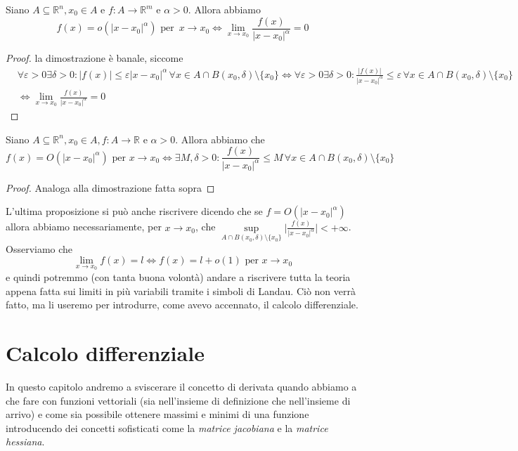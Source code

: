\documentclass[openany]{book}
\begin{document}
\begin{prop}
Siano $A \subseteq \mathbb{R}^n, x_0 \in  A$ e $f: A \to \mathbb{R}^m$ e $\alpha > 0$. Allora abbiamo
$$
f(x) = o(|x-x_0|^\alpha) \text{ per } \, x \to x_0 \iff \lim_{x \to x_0} \frac{f(x)}{|x-x_0|^\alpha} = 0
$$
\end{prop}
\begin{proof}
la dimostrazione è banale, siccome 
\begin{align*}
&\forall \varepsilon > 0 \exists \delta > 0: |f(x)| \leq \varepsilon |x-x_0|^\alpha \, \forall x \in A \cap B(x_0, \delta) \setminus \{ x_0 \} \iff \forall \varepsilon > 0 \exists \delta > 0: \frac{|f(x)|}{|x-x_0|^\alpha} \leq \varepsilon \, \forall x \in A \cap B(x_0, \delta) \setminus \{ x_0 \} \\ &\iff \lim_{x \to x_0} \frac{f(x)}{|x-x_0|^\alpha} = 0
\end{align*}
\end{proof}
\begin{prop}
Siano $A \subseteq \mathbb{R}^n, x_0 \in A, f: A \to \mathbb{R}$ e $\alpha > 0$. Allora abbiamo che $$f(x) = O(|x-x_0|^\alpha) \text{ per } x \to x_0 \iff \exists M, \delta > 0: \frac{f(x)}{|x-x_0|^\alpha} \leq M \, \forall x \in A \cap B(x_0, \delta) \setminus \{ x_0 \}$$
\end{prop}
\begin{proof}
Analoga alla dimostrazione fatta sopra
\end{proof}
\noindent L'ultima proposizione si può anche riscrivere dicendo che se $f=O(|x-x_0|^\alpha)$ allora abbiamo necessariamente, per $x \to x_0$, che $\sup\limits_{A \cap B(x_0, \delta) \setminus \{ x_0 \}} \Bigg| \frac{f(x)}{|x-x_0|^{\alpha}} \Bigg| < +\infty$. \\
Osserviamo che
$$
\lim_{x \to x_0} f(x) = l \iff f(x) = l + o(1) \text{ per } x \to x_0
$$
e quindi potremmo (con tanta buona volontà) andare a riscrivere tutta la teoria appena fatta sui limiti in più variabili tramite i simboli di Landau. Ciò non verrà fatto, ma li useremo per introdurre, come avevo accennato, il calcolo differenziale.
\chapter{Calcolo differenziale}
In questo capitolo andremo a sviscerare il concetto di derivata quando abbiamo a che fare con funzioni vettoriali (sia nell'insieme di definizione che nell'insieme di arrivo) e come sia possibile ottenere massimi e minimi di una funzione introducendo dei concetti sofisticati come la \emph{matrice jacobiana} e la \emph{matrice hessiana}.
\end{document}
